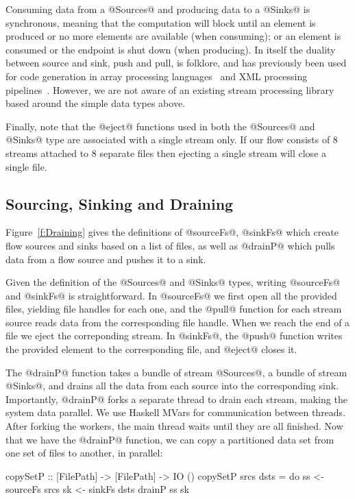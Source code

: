 Consuming data from a @Sources@ and producing data to a @Sinks@ is synchronous, meaning that the computation will block until an element is produced or no more elements are available (when consuming); or an element is consumed or the endpoint is shut down (when producing). In itself the duality between source and sink, push and pull, is folklore, and has previously been used for code generation in array processing languages~\cite{Claessen:ExpressiveArray,Svensson:Defunctionalizing} and XML processing pipelines~\cite{Kay:YouPull}. However, we are not aware of an existing stream processing library based around the simple data types above.

Finally, note that the @eject@ functions used in both the @Sources@ and @Sinks@ type are associated with a single stream only. If our flow consists of 8 streams attached to 8 separate files then ejecting a single stream will close a single file.


\subsection{Sourcing, Sinking and Draining}
Figure~\ref{f:Draining} gives the definitions of @sourceFs@, @sinkFs@ which create flow sources and sinks based on a list of files, as well as @drainP@ which pulls data from a flow source and pushes it to a sink. 

Given the definition of the @Sources@ and @Sinks@ types, writing @sourceFs@ and @sinkFs@ is straightforward. In @sourceFs@ we first open all the provided files, yielding file handles for each one, and the @pull@ function for each stream source reads data from the corresponding file handle. When we reach the end of a file we eject the correponding stream. In @sinkFs@, the @push@ function writes the provided element to the corresponding file, and @eject@ closes it.

The @drainP@ function takes a bundle of stream @Sources@, a bundle of stream @Sinks@, and drains all the data from each source into the corresponding sink. Importantly, @drainP@ forks a separate thread to drain each stream, making the system data parallel. We use Haskell MVars for communication between threads. After forking the workers, the main thread waits until they are all finished. Now that we have the @drainP@ function, we can copy a partitioned data set from one set of files to another, in parallel:

\begin{code}
 copySetP :: [FilePath] -> [FilePath] -> IO ()
 copySetP srcs dsts
  = do  ss <- sourceFs srcs
        sk <- sinkFs   dsts
        drainP ss sk
\end{code}

